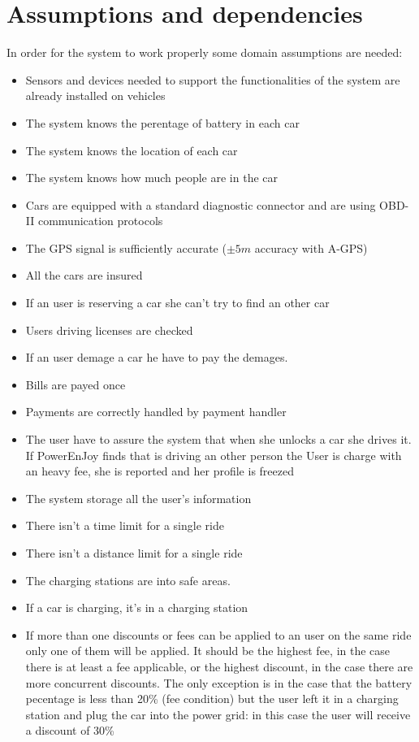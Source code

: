\section{Assumptions and dependencies}
In order for the system to work properly some domain assumptions are needed:%
\begin{itemize}
	\item{Sensors and devices needed to support the functionalities of the system are already installed on vehicles}
	\item{The system knows the perentage of battery in each car}
	\item{The system knows the location of each car}
	\item{The system knows how much people are in the car}
	\item{Cars are equipped with a standard diagnostic connector and are using OBD-II communication protocols}
	\item{The GPS signal is sufficiently accurate ($\pm5m$ accuracy with A-GPS)}
	\item{All the cars are insured}
	\item{If an user is reserving a car she can't try to find an other car}
	\item{Users driving licenses are checked}
	\item{If an user demage a car he have to pay the demages.}
	\item{Bills are payed once}
	\item{Payments are correctly handled by payment handler}
	\item {The user have to assure the system that when she unlocks a car she drives it. If PowerEnJoy finds that is driving an other person the User is charge with an heavy fee, she is reported and her profile is freezed}
	\item{The system storage all the user's information}
	\item{There isn't a time limit for a single ride}%
	\item{There isn't a distance limit for a single ride}%
	\item {The charging stations are into safe areas.}
	\item {If a car is charging, it's in a \gls{charging station}}
	\item{If more than one discounts or fees can be applied to an user on the same ride only one of them will be applied. It should be the highest fee, in the case there is at least a fee applicable, or the highest discount, in the case there are more concurrent discounts. The only exception is in the case that the battery pecentage is less than 20\% (fee condition) but the user left it in a \gls{charging station} and plug the car into the power grid: in this case the user will receive a discount of 30\%}

\end{itemize}
